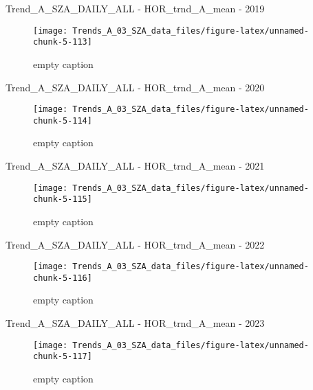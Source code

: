 \documentclass[
  10pt,
  a4paper,oneside]{article}
\begin{document}
Trend\_A\_SZA\_DAILY\_ALL - HOR\_trnd\_A\_mean - 2019

\begin{figure}[!ht]

{\centering \texttt{[image: Trends\_A\_03\_SZA\_data\_files/figure-latex/unnamed-chunk-5-113]} 

}

\caption{ empty caption }\label{fig:unnamed-chunk-5-113}
\end{figure}

Trend\_A\_SZA\_DAILY\_ALL - HOR\_trnd\_A\_mean - 2020

\begin{figure}[!ht]

{\centering \texttt{[image: Trends\_A\_03\_SZA\_data\_files/figure-latex/unnamed-chunk-5-114]} 

}

\caption{ empty caption }\label{fig:unnamed-chunk-5-114}
\end{figure}

Trend\_A\_SZA\_DAILY\_ALL - HOR\_trnd\_A\_mean - 2021

\begin{figure}[!ht]

{\centering \texttt{[image: Trends\_A\_03\_SZA\_data\_files/figure-latex/unnamed-chunk-5-115]} 

}

\caption{ empty caption }\label{fig:unnamed-chunk-5-115}
\end{figure}

Trend\_A\_SZA\_DAILY\_ALL - HOR\_trnd\_A\_mean - 2022

\begin{figure}[!ht]

{\centering \texttt{[image: Trends\_A\_03\_SZA\_data\_files/figure-latex/unnamed-chunk-5-116]} 

}

\caption{ empty caption }\label{fig:unnamed-chunk-5-116}
\end{figure}

Trend\_A\_SZA\_DAILY\_ALL - HOR\_trnd\_A\_mean - 2023

\begin{figure}[!ht]

{\centering \texttt{[image: Trends\_A\_03\_SZA\_data\_files/figure-latex/unnamed-chunk-5-117]} 

}

\caption{ empty caption }\label{fig:unnamed-chunk-5-117}
\end{figure}
\end{document}
